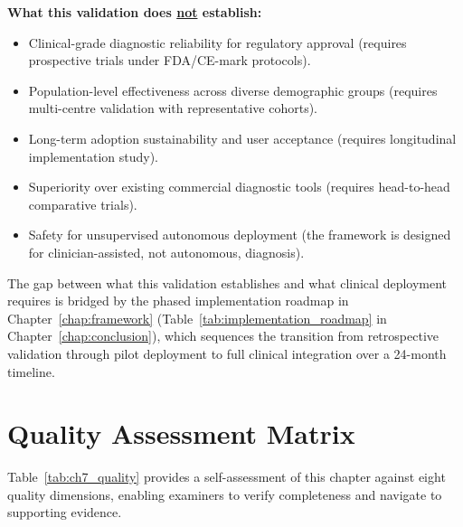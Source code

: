 \textbf{What this validation does \underline{not} establish:}
\begin{itemize}
    \item Clinical-grade diagnostic reliability for regulatory approval (requires prospective trials under FDA/CE-mark protocols).
    \item Population-level effectiveness across diverse demographic groups (requires multi-centre validation with representative cohorts).
    \item Long-term adoption sustainability and user acceptance (requires longitudinal implementation study).
    \item Superiority over existing commercial diagnostic tools (requires head-to-head comparative trials).
    \item Safety for unsupervised autonomous deployment (the framework is designed for clinician-assisted, not autonomous, diagnosis).
\end{itemize}

The gap between what this validation establishes and what clinical deployment requires is bridged by the phased implementation roadmap in Chapter~\ref{chap:framework} (Table~\ref{tab:implementation_roadmap} in Chapter~\ref{chap:conclusion}), which sequences the transition from retrospective validation through pilot deployment to full clinical integration over a 24-month timeline.


\section{Quality Assessment Matrix}
\label{sec:ch7_quality}

Table~\ref{tab:ch7_quality} provides a self-assessment of this chapter against eight quality dimensions, enabling examiners to verify completeness and navigate to supporting evidence.

